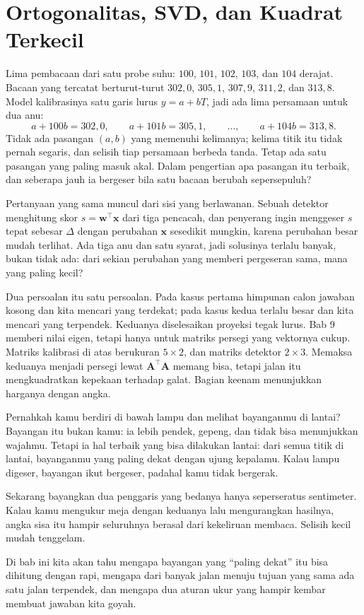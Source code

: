 \chapter{Ortogonalitas, SVD, dan Kuadrat Terkecil}

Lima pembacaan dari satu probe suhu: $100$, $101$, $102$, $103$, dan $104$ derajat.
Bacaan yang tercatat berturut-turut $302{,}0$, $305{,}1$, $307{,}9$, $311{,}2$, dan
$313{,}8$. Model kalibrasinya satu garis lurus $y=a+bT$, jadi ada lima persamaan untuk
dua anu:
\[
  a+100b=302{,}0,\qquad a+101b=305{,}1,\qquad \dots,\qquad a+104b=313{,}8 .
\]
Tidak ada pasangan $(a,b)$ yang memenuhi kelimanya; kelima titik itu tidak pernah
segaris, dan selisih tiap persamaan berbeda tanda. Tetap ada satu pasangan yang
paling masuk akal. Dalam pengertian apa pasangan itu terbaik, dan seberapa jauh ia
bergeser bila satu bacaan berubah sepersepuluh?

Pertanyaan yang sama muncul dari sisi yang berlawanan. Sebuah detektor menghitung skor
$s=\mathbf{w}^{\top}\mathbf{x}$ dari tiga pencacah, dan penyerang ingin menggeser $s$
tepat sebesar $\Delta$ dengan perubahan $\mathbf{x}$ sesedikit mungkin, karena perubahan
besar mudah terlihat. Ada tiga anu dan satu syarat, jadi solusinya terlalu banyak, bukan
tidak ada: dari sekian perubahan yang memberi pergeseran sama, mana yang paling kecil?

Dua persoalan itu satu persoalan. Pada kasus pertama himpunan calon jawaban kosong dan
kita mencari yang terdekat; pada kasus kedua terlalu besar dan kita mencari yang
terpendek. Keduanya diselesaikan proyeksi tegak lurus. Bab 9 memberi nilai eigen, tetapi
hanya untuk matriks persegi yang vektornya cukup.
Matriks kalibrasi di atas berukuran $5\times2$, dan matriks detektor $2\times3$.
Memaksa keduanya menjadi persegi lewat $\mathbf{A}^{\top}\mathbf{A}$ memang bisa,
tetapi jalan itu mengkuadratkan kepekaan terhadap galat. Bagian keenam menunjukkan
harganya dengan angka.

\begin{untukanak}
Pernahkah kamu berdiri di bawah lampu dan melihat bayanganmu di lantai? Bayangan itu
bukan kamu: ia lebih pendek, gepeng, dan tidak bisa menunjukkan wajahmu. Tetapi ia hal
terbaik yang bisa dilakukan lantai: dari semua titik di lantai, bayanganmu yang paling
dekat dengan ujung kepalamu. Kalau lampu digeser, bayangan ikut bergeser, padahal kamu
tidak bergerak.

Sekarang bayangkan dua penggaris yang bedanya hanya seperseratus sentimeter. Kalau kamu
mengukur meja dengan keduanya lalu mengurangkan hasilnya, angka sisa itu hampir
seluruhnya berasal dari kekeliruan membaca. Selisih kecil mudah tenggelam.

Di bab ini kita akan tahu mengapa bayangan yang ``paling dekat'' itu bisa dihitung dengan
rapi, mengapa dari banyak jalan menuju tujuan yang sama ada satu jalan terpendek, dan
mengapa dua aturan ukur yang hampir kembar membuat jawaban kita goyah.
\end{untukanak}

